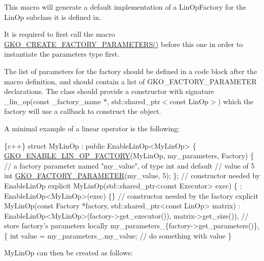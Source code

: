 This macro will generate a default implementation of a Lin\+Op\+Factory for the Lin\+Op subclass it is defined in. 

It is required to first call the macro \hyperlink{group__LinOp_ga1fc8e9d8be0c9ad2d72bc1ddfc6d8358}{G\+K\+O\+\_\+\+C\+R\+E\+A\+T\+E\+\_\+\+F\+A\+C\+T\+O\+R\+Y\+\_\+\+P\+A\+R\+A\+M\+E\+T\+E\+R\+S()} before this one in order to instantiate the parameters type first.

The list of parameters for the factory should be defined in a code block after the macro definition, and should contain a list of G\+K\+O\+\_\+\+F\+A\+C\+T\+O\+R\+Y\+\_\+\+P\+A\+R\+A\+M\+E\+T\+ER declarations. The class should provide a constructor with signature \+\_\+lin\+\_\+op(const \+\_\+factory\+\_\+name $\ast$, std\+::shared\+\_\+ptr$<$const Lin\+Op$>$) which the factory will use a callback to construct the object.

A minimal example of a linear operator is the following\+:


\begin{DoxyCode}
\{c++\}
\textcolor{keyword}{struct }MyLinOp : \textcolor{keyword}{public} EnableLinOp<MyLinOp> \{
    \hyperlink{group__LinOp_ga8e0af90ec2414b768266f77cedffc309}{GKO\_ENABLE\_LIN\_OP\_FACTORY}(MyLinOp, my\_parameters, Factory) \{
        \textcolor{comment}{// a factory parameter named "my\_value", of type int and default}
        \textcolor{comment}{// value of 5}
        \textcolor{keywordtype}{int} \hyperlink{group__LinOp_gaa037309884bbd0562b897cee95dd91c8}{GKO\_FACTORY\_PARAMETER}(my\_value, 5);
    \};
    \textcolor{comment}{// constructor needed by EnableLinOp}
    \textcolor{keyword}{explicit} MyLinOp(std::shared\_ptr<const Executor> exec) \{
        : EnableLinOp<MyLinOp>(exec) \{\}
    \textcolor{comment}{// constructor needed by the factory}
    \textcolor{keyword}{explicit} MyLinOp(\textcolor{keyword}{const} Factory *factory,
                     std::shared\_ptr<const LinOp> matrix)
        : EnableLinOp<MyLinOp>(factory->get\_executor()), matrix->get\_size()),
          \textcolor{comment}{// store factory's parameters locally}
          my\_parameters\_\{factory->get\_parameters()\},
    \{
         \textcolor{keywordtype}{int} value = my\_parameters\_.my\_value;
         \textcolor{comment}{// do something with value}
    \}
\end{DoxyCode}


My\+Lin\+Op can then be created as follows\+:


